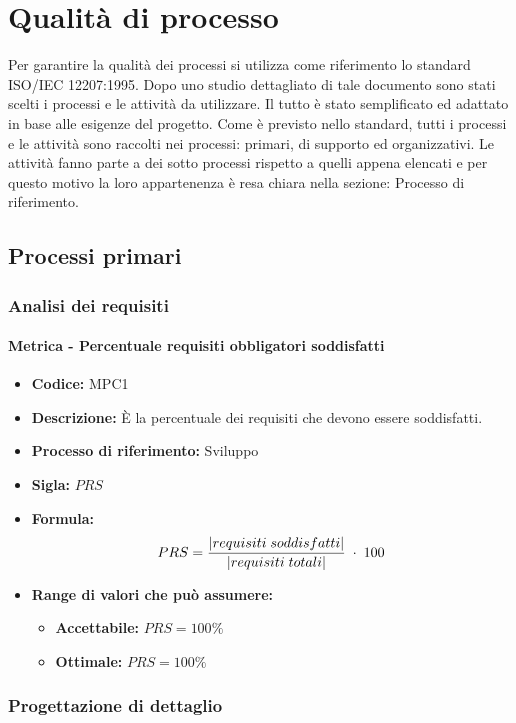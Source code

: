 \section{Qualità di processo}
Per garantire la qualità dei processi si utilizza come riferimento lo standard ISO/IEC 12207:1995. Dopo uno studio dettagliato di tale documento sono stati scelti i processi
e le attività da utilizzare. Il tutto è stato semplificato ed adattato in base alle esigenze del progetto. Come è previsto nello standard, tutti i processi e le attività sono raccolti 
nei processi: primari, di supporto ed organizzativi. Le attività fanno parte a dei sotto processi rispetto a quelli appena elencati e per questo motivo la loro 
appartenenza è resa chiara nella sezione: Processo di riferimento.

\subsection{Processi primari}

\subsubsection{Analisi dei requisiti}
    \paragraph{Metrica - Percentuale requisiti obbligatori soddisfatti}
    \begin{itemize}
        \item \textbf{Codice:} MPC1
        \item \textbf{Descrizione:} È la percentuale dei requisiti che devono essere soddisfatti.
        \item \textbf{Processo di riferimento:} Sviluppo
        \item \textbf{Sigla:} $PRS$
        \item \textbf{Formula:} $$PRS = {|requisiti \; soddisfatti| \over |requisiti \; totali|}\; \cdot \; 100$$
        \item \textbf{Range di valori che può assumere:}
        \begin{itemize}
            \item \textbf{Accettabile:} $PRS = 100\%$
            \item \textbf{Ottimale:} $PRS = 100\%$
        \end{itemize}
    \end{itemize} 
\subsubsection{Progettazione di dettaglio}

